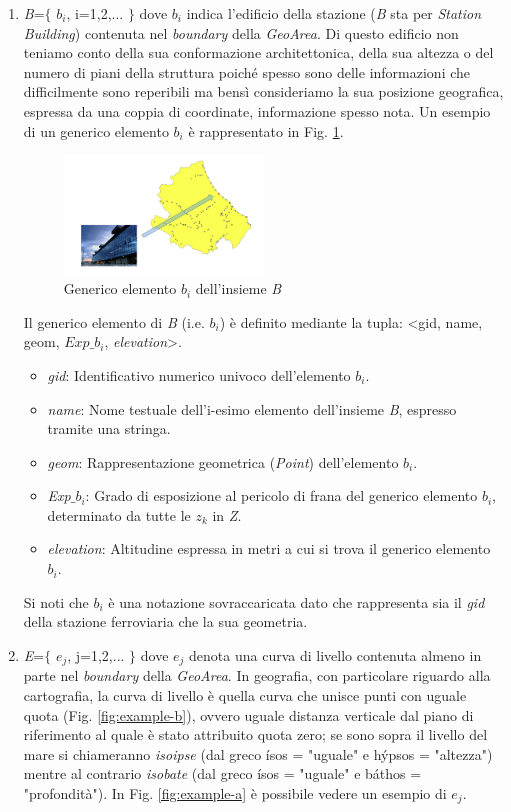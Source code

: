 \begin{enumerate}
\item\textit{B}=$\{$ $b_i$, i=1,2,... $\}$ dove $b_i$ indica l'edificio della stazione (\textit{B} sta per \textit{Station Building}) contenuta nel \textit{boundary} della \textit{GeoArea}. Di questo edificio non teniamo conto della sua conformazione architettonica, della sua altezza o del numero di piani della struttura poiché spesso sono delle informazioni che difficilmente sono reperibili ma bensì consideriamo la sua posizione geografica, espressa da una coppia di coordinate, informazione spesso nota. Un esempio di un generico elemento $b_i$ è rappresentato in Fig. \ref{fig:b}.
\newpage
\begin{figure}[bht]
\centering
\includegraphics[width=0.5\textwidth]{img/stazionegenerica}
\caption{Generico elemento $b_i$ dell'insieme \textit{B}}
	\label{fig:b}
\end{figure}

Il generico elemento di \textit{B} (i.e. $b_i$) è definito mediante la tupla: <gid, name, geom, \textit{$Exp\_b_i$}, \textit{elevation}>.
\begin{itemize}
\item \textit{gid}: Identificativo numerico univoco dell'elemento $b_i$.
\item \textit{name}: Nome testuale dell'i-esimo elemento dell'insieme \textit{B}, espresso tramite una stringa.
\item \textit{geom}: Rappresentazione geometrica (\textit{Point}) dell'elemento $b_i$.
\item \textit{Exp$\_$$b_i$}: Grado di esposizione al pericolo di frana del generico elemento $b_i$, determinato da tutte le $z_k$ in \textit{Z}.
\item \textit{elevation}: Altitudine espressa in metri a cui si trova il generico elemento $b_i$.
\end{itemize}
Si noti che $b_i$ è una notazione sovraccaricata dato che rappresenta sia il \textit{gid} della stazione ferroviaria che la sua geometria.
\item\textit{E}=$\{$ $e_j$, j=1,2,... $\}$ dove $e_j$ denota una curva di livello contenuta almeno in parte nel \textit{boundary} della \textit{GeoArea}. In geografia, con particolare riguardo alla cartografia, la curva di livello è quella curva che unisce punti con uguale quota (Fig. \ref{fig:example-b}), ovvero uguale distanza verticale dal piano di riferimento al quale è stato attribuito quota zero; se sono sopra il livello del mare si chiameranno \textit{isoipse} (dal greco ísos = "uguale" e hýpsos = "altezza") mentre al contrario \textit{isobate} (dal greco ísos = "uguale" e báthos = "profondità"). In Fig. \ref{fig:example-a} è possibile vedere un esempio di $e_j$.


\end{enumerate}
